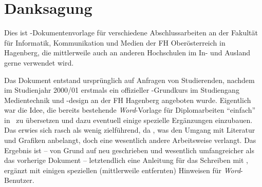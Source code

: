 \chapter{\textbf{Danksagung}} 	%


Dies ist \latex-Dokumentenvorlage für 
verschiedene Abschlussarbeiten an der Fakultät für Informatik, Kommunikation
und Medien der FH Oberösterreich in Hagenberg, die mittlerweile auch 
an anderen Hochschulen im In- und Ausland gerne verwendet wird.

Das Dokument entstand ursprünglich auf Anfragen von Studierenden,
nachdem im Studienjahr 2000/01 erstmals ein offizieller
\latex-Grundkurs im Studiengang Medientechnik und -design an der
FH Hagenberg angeboten wurde. Eigentlich war die Idee, die bereits
bestehende \emph{Word}-Vorlage für Diplomarbeiten "`einfach"' in
\latex\ zu übersetzen und dazu eventuell einige spezielle
Ergänzungen einzubauen. Das erwies sich rasch als wenig
zielführend, da \latex, \va was den Umgang mit Literatur und
Grafiken anbelangt, doch eine wesentlich andere Arbeitsweise
verlangt. Das Ergebnis ist -- von Grund auf neu geschrieben und
wesentlich umfangreicher als das vorherige Dokument --
letztendlich eine Anleitung für das Schreiben mit \latex, ergänzt
mit einigen speziellen (mittlerweile entfernten) Hinweisen für \emph{Word}-Benutzer.




